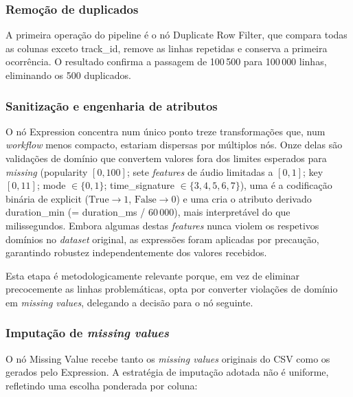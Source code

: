 \documentclass[11pt,a4paper]{article}
\newcommand{\code}[1]{{\ttfamily\hyphenchar\font=45\relax #1}}
\begin{document}
\subsubsection{Remoção de duplicados}

A primeira operação do pipeline é o nó \code{Duplicate Row Filter}, que compara todas as colunas exceto \code{track\_id}, remove as linhas repetidas e conserva a primeira ocorrência. O resultado confirma a passagem de 100\,500 para 100\,000 linhas, eliminando os 500 duplicados.

\subsubsection{Sanitização e engenharia de atributos}

O nó \code{Expression} concentra num único ponto treze transformações que, num \textit{workflow} menos compacto, estariam dispersas por múltiplos nós. Onze delas são validações de domínio que convertem valores fora dos limites esperados para \textit{missing} (popularity $[0,100]$; sete \textit{features} de áudio limitadas a $[0,1]$; \code{key} $[0,11]$; \code{mode} $\in\{0,1\}$; \code{time\_signature} $\in\{3,4,5,6,7\}$), uma é a codificação binária de \code{explicit} ($\text{True}\rightarrow 1$, $\text{False}\rightarrow 0$) e uma cria o atributo derivado \code{duration\_min} (= \code{duration\_ms} / 60\,000), mais interpretável do que milissegundos. Embora algumas destas \textit{features} nunca violem os respetivos domínios no \textit{dataset} original, as expressões foram aplicadas por precaução, garantindo robustez independentemente dos valores recebidos.

Esta etapa é metodologicamente relevante porque, em vez de eliminar precocemente as linhas problemáticas, opta por converter violações de domínio em \textit{missing values}, delegando a decisão para o nó seguinte.

\subsubsection{Imputação de \textit{missing values}}

O nó \code{Missing Value} recebe tanto os \textit{missing values} originais do CSV como os gerados pelo \code{Expression}. A estratégia de imputação adotada não é uniforme, refletindo uma escolha ponderada por coluna:
\end{document}
